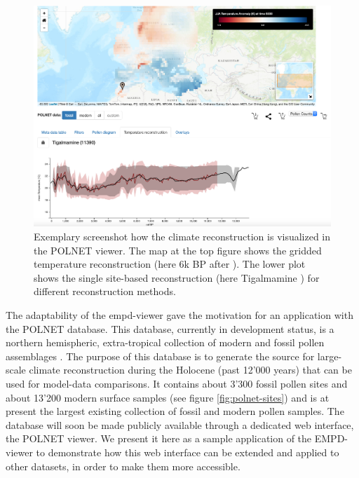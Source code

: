 \documentclass[
11pt, %
english, %
singlespacing, %
headsepline, %
]{MastersDoctoralThesis} %
\begin{document}
\begin{NoHyper}
\begin{refsection}
\begin{figure}[h]
	\includegraphics[width=\linewidth]{empd-figures/polnet-climate-plots.png}
	\caption[Climate reconstructions visualized in the POLNET viewer]{Exemplary screenshot how the climate reconstruction is visualized in the POLNET viewer. The map at the top figure shows the gridded temperature reconstruction (here 6k BP after \cite{MauriDavisCollinsEtAl2015}). The lower plot shows the single site-based reconstruction (here Tigalmamine \citep{CheddadiLambGuiotEtAl1998}) for different reconstruction methods.}
	\label{fig:polnet-climate}
\end{figure}

The adaptability of the \gls{empd}-viewer gave the motivation for an application with the POLNET database. This database, currently in development status, is a northern hemispheric, extra-tropical collection of modern and fossil pollen assemblages \citep{DavisKaplan2017, SommerDavisChevalierEtAl2019}. The purpose of this database is to generate the source for large-scale climate reconstruction during the Holocene (past 12'000 years) that can be used for model-data comparisons. It contains about 3'300 fossil pollen sites and about 13'200 modern surface samples (see figure \ref{fig:polnet-sites}) and is at present the largest existing collection of fossil and modern pollen samples. The database will soon be made publicly available through a dedicated web interface, the POLNET viewer. We present it here as a sample application of the EMPD-viewer to demonstrate how this web interface can be extended and applied to other datasets, in order to make them more accessible.


\end{refsection}
\end{NoHyper}
\end{document}
